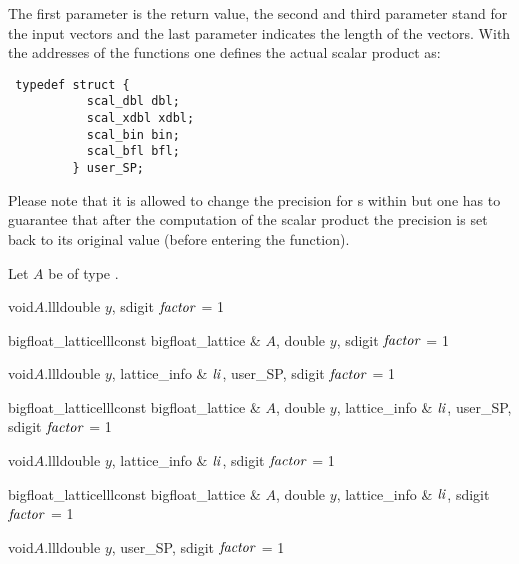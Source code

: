 The first parameter is the return value, the second and third parameter stand for the input
vectors and the last parameter indicates the length of the vectors.  With the addresses of the
functions one defines the actual scalar product as:
\begin{verbatim}
 typedef struct {
           scal_dbl dbl;
           scal_xdbl xdbl;
           scal_bin bin;
           scal_bfl bfl;
         } user_SP;
\end{verbatim}
Please note that it is allowed to change the precision for s within  but one has to guarantee that
after the computation of the scalar product the precision is set back to its original value
(before entering the function).

Let $A$ be of type .

\begin{fcode}{void}{$A$.lll}{double $y$, sdigit $\mathit{factor}$ = 1}
\end{fcode}

\begin{fcode}{bigfloat_lattice}{lll}{const bigfloat_lattice & $A$, double $y$,
    sdigit $\mathit{factor}$ = 1}%
\end{fcode}

\begin{fcode}{void}{$A$.lll}{double $y$, lattice_info & $\mathit{li}$, user_SP, sdigit $\mathit{factor}$ = 1}
\end{fcode}

\begin{fcode}{bigfloat_lattice}{lll}{const bigfloat_lattice & $A$, double $y$,
    lattice_info & $\mathit{li}$, user_SP, sdigit $\mathit{factor}$ = 1}%
\end{fcode}

\begin{fcode}{void}{$A$.lll}{double $y$, lattice_info & $\mathit{li}$, sdigit $\mathit{factor}$ = 1}
\end{fcode}

\begin{fcode}{bigfloat_lattice}{lll}{const bigfloat_lattice & $A$, double $y$,
    lattice_info & $\mathit{li}$, sdigit $\mathit{factor}$ = 1}%
\end{fcode}

\begin{fcode}{void}{$A$.lll}{double $y$, user_SP, sdigit $\mathit{factor}$ = 1}
\end{fcode}

